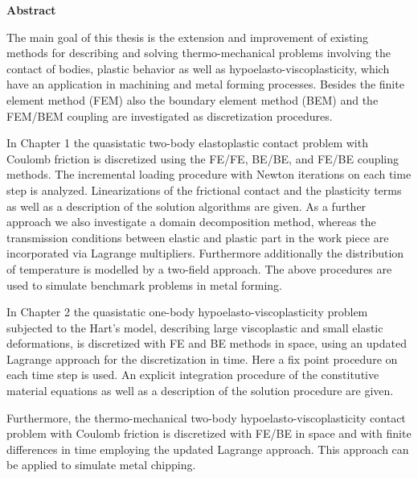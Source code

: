 \vspace*{-15.0mm}

 
 
 \begin{center}
 \textsf{ \large
 \textbf{Abstract}}
 \end{center}

\vspace*{-3.0mm}
The main goal of this thesis is the extension and improvement of  existing methods for  describing and solving thermo-mechanical  problems involving the contact of bodies, plastic behavior as well as hypoelasto-viscoplasticity, which have an application in machining and  metal forming processes. Besides the finite element method (FEM) also the boundary element method (BEM) and the FEM/BEM coupling are investigated as discretization procedures.

In Chapter 1 the quasistatic two-body elastoplastic contact problem with Coulomb friction is discretized using the FE/FE, BE/BE, and FE/BE coupling methods. The incremental loading procedure with Newton iterations on each time step is analyzed. Linearizations of the frictional contact and the plasticity terms as well as a description of the solution algorithms are given. As a further approach we also investigate a domain decomposition method, whereas the transmission conditions between elastic and plastic part in the work piece are incorporated via Lagrange multipliers. Furthermore additionally the distribution of temperature is modelled by a two-field approach. The above procedures are used to simulate benchmark problems in metal forming.

In Chapter 2 the quasistatic one-body hypoelasto-viscoplasticity problem subjected to the Hart's model, describing  large viscoplastic and small elastic deformations, is discretized with FE and BE methods in space, using an updated Lagrange approach for the discretization in time. Here a fix point  procedure  on each time step is used. An explicit integration procedure of the constitutive material equations  as well as a description of the solution procedure are given.

Furthermore, the thermo-mechanical  two-body hypoelasto-viscoplasticity contact problem with Coulomb friction  is discretized with FE/BE in space and with finite differences in time employing the updated Lagrange approach. This approach can be applied to simulate metal chipping.

